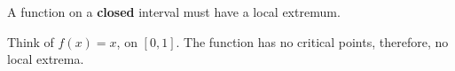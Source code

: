 \documentclass{ximera}
\author{Steven Gubkin\and Nela Lakos}
\begin{document}
\begin{exercise}

	A function on a \textbf{closed} interval must have a local extremum.
	\begin{hint}
 Think of $f(x)=x$, on $[0,1]$. The function has no critical points, therefore, no local extrema.
\end{hint}	
	\begin{multipleChoice}
	\end{multipleChoice}


\end{exercise}
\end{document}

